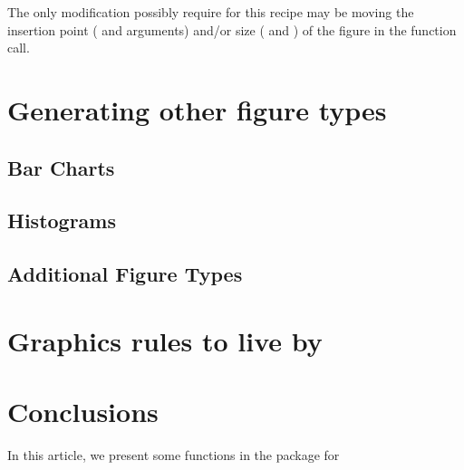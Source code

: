 \documentclass[nojss, letterpaper]{jss}\usepackage[]{graphicx}\usepackage[]{color}
\begin{document}
The only modification possibly require for this recipe may be moving the insertion point ( and  arguments) and/or size ( and ) of the figure in the  function call.

\section{Generating other figure types}\label{S:alternateFigures}

\subsection{Bar Charts}
 

\subsection{Histograms}

\subsection{Additional Figure Types}


\section{Graphics rules to live by}\label{S:rules}

\section{Conclusions} \label{S:concl}
In this article, we present some functions in the  package for  



\end{document}
